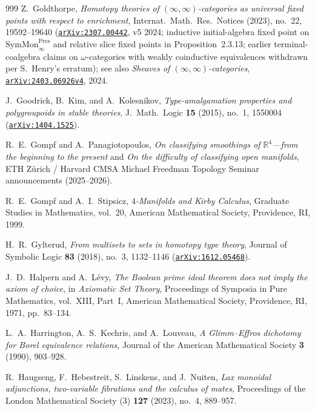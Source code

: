 \begin{thebibliography}{999}
Z.~Goldthorpe,
\emph{Homotopy theories of $(\infty, \infty)$-categories as universal fixed points with respect to enrichment},
Internat.\ Math.\ Res.\ Notices (2023), no.~22, 19592--19640 (\href{https://arxiv.org/abs/2307.00442}{\texttt{arXiv:2307.00442}}, v5 2024; inductive initial-algebra fixed point on $\mathrm{SymMon}^{\mathrm{Pres}}_\infty$ and relative slice fixed points in Proposition~2.3.13; earlier terminal-coalgebra claims on $\omega$-categories with weakly coinductive equivalences withdrawn per S.~Henry's erratum); see also \emph{Sheaves of $(\infty, \infty)$-categories}, \href{https://arxiv.org/abs/2403.06926v4}{\texttt{arXiv:2403.06926v4}}, 2024.

J.~Goodrick, B.~Kim, and A.~Kolesnikov,
\emph{Type-amalgamation properties and polygroupoids in stable theories},
J.\ Math.\ Logic \textbf{15} (2015), no.~1, 1550004 (\href{https://arxiv.org/abs/1404.1525}{\texttt{arXiv:1404.1525}}).

R.~E.~Gompf and A.~Panagiotopoulos,
\emph{On classifying smoothings of $\mathbb{R}^4$---from the beginning to the present} and \emph{On the difficulty of classifying open manifolds},
ETH Z\"urich / Harvard CMSA Michael Freedman Topology Seminar announcements (2025--2026).

R.~E.~Gompf and A.~I.~Stipsicz,
\emph{$4$-Manifolds and Kirby Calculus},
Graduate Studies in Mathematics, vol.~20, American Mathematical Society, Providence, RI, 1999.

H.~R.~Gylterud,
\emph{From multisets to sets in homotopy type theory},
Journal of Symbolic Logic \textbf{83} (2018), no.~3, 1132--1146 (\href{https://arxiv.org/abs/1612.05468}{\texttt{arXiv:1612.05468}}).

J.~D.~Halpern and A.~L\'evy,
\emph{The Boolean prime ideal theorem does not imply the axiom of choice},
in \emph{Axiomatic Set Theory}, Proceedings of Symposia in Pure Mathematics, vol.~XIII, Part~I, American Mathematical Society, Providence, RI, 1971, pp.~83--134.

L.~A.~Harrington, A.~S.~Kechris, and A.~Louveau,
\emph{A Glimm--Effros dichotomy for Borel equivalence relations},
Journal of the American Mathematical Society \textbf{3} (1990), 903--928.

R.~Haugseng, F.~Hebestreit, S.~Linskens, and J.~Nuiten,
\emph{Lax monoidal adjunctions, two-variable fibrations and the calculus of mates},
Proceedings of the London Mathematical Society (3) \textbf{127} (2023), no.~4, 889--957.


\end{thebibliography}
